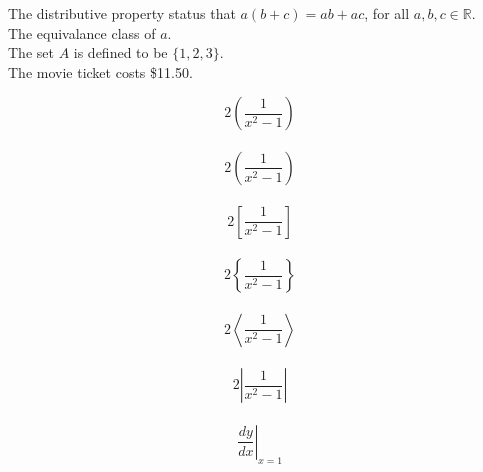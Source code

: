 \documentclass[11pt]{article}
\begin{document}
	The distributive property status that $a(b+c) = ab + ac$, for all $a, b, c \in \mathbb{R}$.\\[6pt]
	The equivalance class of $a$.\\[6pt]
	The set $A$ is defined to be $\{1, 2, 3\}$.\\[6pt]
	The movie ticket costs \$11.50.
	
	$$2(\frac{1}{x^2-1})$$
	\\[1pt]
	$$2\left(\frac{1}{x^2-1}\right)$$
	\\[3pt]
	$$2\left[\frac{1}{x^2-1}\right]$$
	\\[3pt]
	$$2 \left \{ \frac{1}{x^2-1} \right \}  $$
	\\[3pt]
	$$2 \left \langle \frac{1}{x^2-1} \right \rangle  $$
	\\[3pt]
	$$2 \left | \frac{1}{x^2-1} \right |  $$
	\\[3pt]
	$$\left. \frac{dy}{dx}\right|_{x=1} $$
	\\[3pt]
	
\end{document}
